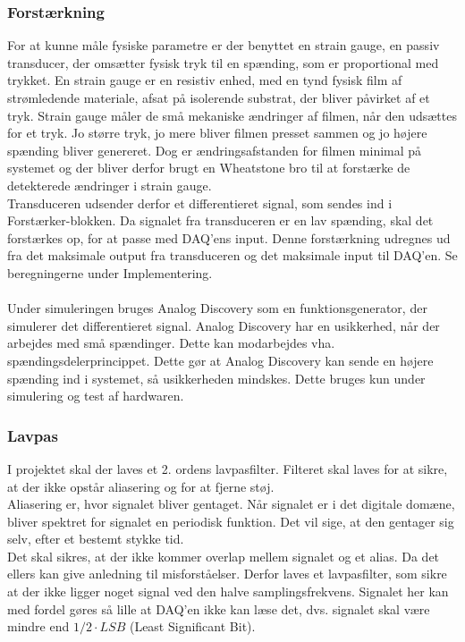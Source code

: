 \subsubsection{Forstærkning}
For at kunne måle fysiske parametre er der benyttet en strain gauge\cite{Wheatstone}, en passiv transducer, der omsætter fysisk tryk til en spænding, som er proportional med trykket. En strain gauge er en resistiv enhed, med en tynd fysisk film af strømledende materiale, afsat på isolerende substrat, der bliver påvirket af et tryk. Strain gauge måler de små mekaniske ændringer af filmen, når den udsættes for et tryk. Jo større tryk, jo mere bliver filmen presset sammen og jo højere spænding bliver genereret. Dog er ændringsafstanden for filmen minimal på systemet og der bliver derfor brugt en Wheatstone\cite{Wheatstone} bro til at forstærke de detekterede ændringer i strain gauge.\\
Transduceren udsender derfor et differentieret signal, som sendes ind i Forstærker-blokken. Da signalet fra transduceren er en lav spænding, skal det forstærkes op, for at passe med DAQ'ens input. Denne forstærkning udregnes ud fra det maksimale output fra transduceren og det maksimale input til DAQ'en. Se beregningerne under Implementering. \\ 
\\
Under simuleringen bruges Analog Discovery som en funktionsgenerator, der simulerer det differentieret signal. Analog Discovery har en usikkerhed, når der arbejdes med små spændinger. Dette kan modarbejdes vha. spændingsdelerprincippet. Dette gør at Analog Discovery kan sende en højere spænding ind i systemet, så usikkerheden mindskes. Dette bruges kun under simulering og test af hardwaren.   

\subsubsection{Lavpas}
I projektet skal der laves et 2. ordens lavpasfilter. Filteret skal laves for at sikre, at der ikke opstår aliasering og for at fjerne støj.\\
Aliasering \cite{DSB} er, hvor signalet bliver gentaget. Når signalet er i det digitale domæne, bliver spektret for signalet en periodisk funktion. Det vil sige, at den gentager sig selv, efter et bestemt stykke tid. \\
Det skal sikres, at der ikke kommer overlap mellem signalet og et alias. Da det ellers kan give anledning til misforståelser. Derfor laves et lavpasfilter, som sikre at der ikke ligger noget signal ved den halve samplingsfrekvens. Signalet her kan med fordel gøres så lille at DAQ'en ikke kan læse det, dvs. signalet skal være mindre end $ 1/2 \cdot LSB $ (Least Significant Bit).    

